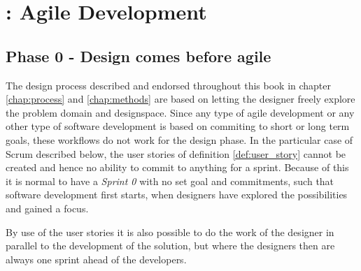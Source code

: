 \section{\todo : Agile Development} \label{sec:agile_development}


\begin{concept} \label{conc:agile} 
  
\end{concept}

\begin{definition} \label{def:user_story} 
  
\end{definition}

\begin{definition} \label{def:product_owner} 

\end{definition}

\begin{definition} \label{def:product_backlog} 

\end{definition}

\subsection{Phase 0 - Design comes before agile} \label{sec:design_before_agile}
The design process described and endorsed throughout this book in chapter \ref{chap:process} and \ref{chap:methods} are based on letting the designer freely explore the problem domain and designspace. Since any type of agile development or any other type of software development is based on commiting to short or long term goals, these workflows do not work for the design phase. In the particular case of Scrum described below, the user stories of definition \ref{def:user_story} cannot be created and hence no ability to commit to anything for a sprint. Because of this it is normal to have a \emph{Sprint 0} with no set goal and commitments, such that software development first starts, when designers have explored the possibilities and gained a focus. \cite[p. 27]{beyer}

By use of the user stories it is also possible to do the work of the designer in parallel to the development of the solution, but where the designers then are always one sprint ahead of the developers. \cite[p. 13]{beyer}

